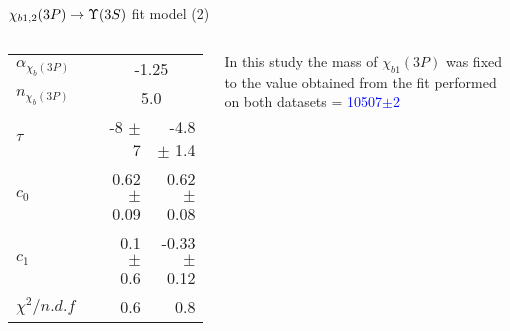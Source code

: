 \begin{frame}{$\chi_{b1,2}(3P) \to \ThreeS$ fit model (2)}
\begin{columns}[T]
{\begin{tabular}{lrrr}
    \rule{0pt}{4ex}$\alpha_{\chi_{b}(3P)}$  && \multicolumn{2}{c}{-1.25} \\
    $n_{\chi_{b}(3P)}$  && \multicolumn{2}{c}{5.0} \\

    \rule{0pt}{4ex}$\tau$  && -8 $\pm$ 7 & -4.8 $\pm$ 1.4 \\
    $c_0$  && 0.62 $\pm$ 0.09 & 0.62 $\pm$ 0.08 \\
    $c_1$  && 0.1 $\pm$ 0.6 & -0.33 $\pm$ 0.12 \\

    \rule{0pt}{4ex}$\chi^2 / n.d.f$  && 0.6 & 0.8 \\
    \bottomrule
\end{tabular}
}
%
\bigskip

In this study the mass of $\chi_{b1}(3P)$ was fixed to the value obtained from
the fit performed on both datasets =  \textcolor{blue}{10507$\pm$2}~\mevcc
\end{columns}


\end{frame}
